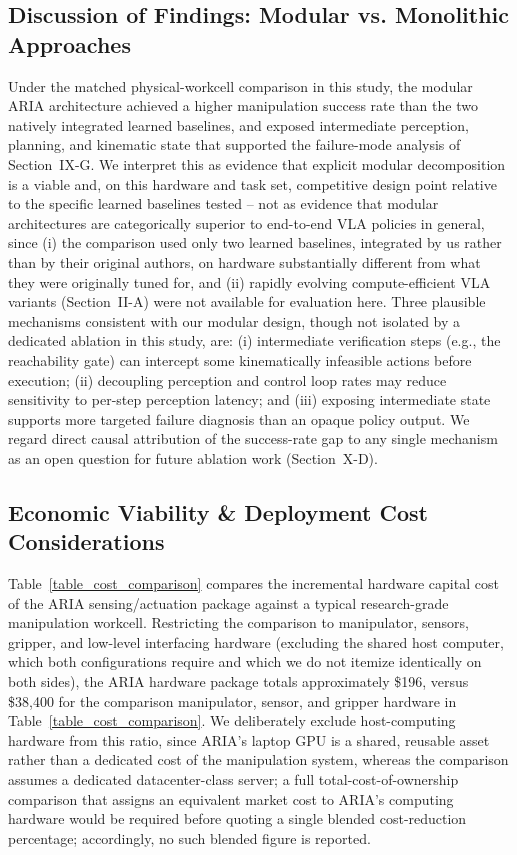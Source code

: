 \documentclass[journal]{IEEEtran}
\begin{document}
\subsection{Discussion of Findings: Modular vs. Monolithic Approaches}
Under the matched physical-workcell comparison in this study, the modular ARIA architecture achieved a higher manipulation success rate than the two natively integrated learned baselines, and exposed intermediate perception, planning, and kinematic state that supported the failure-mode analysis of Section~IX-G. We interpret this as evidence that explicit modular decomposition is a viable and, on this hardware and task set, competitive design point relative to the specific learned baselines tested -- not as evidence that modular architectures are categorically superior to end-to-end VLA policies in general, since (i) the comparison used only two learned baselines, integrated by us rather than by their original authors, on hardware substantially different from what they were originally tuned for, and (ii) rapidly evolving compute-efficient VLA variants (Section~II-A) were not available for evaluation here. Three plausible mechanisms consistent with our modular design, though not isolated by a dedicated ablation in this study, are: (i) intermediate verification steps (e.g., the reachability gate) can intercept some kinematically infeasible actions before execution; (ii) decoupling perception and control loop rates may reduce sensitivity to per-step perception latency; and (iii) exposing intermediate state supports more targeted failure diagnosis than an opaque policy output. We regard direct causal attribution of the success-rate gap to any single mechanism as an open question for future ablation work (Section~X-D).

\subsection{Economic Viability \& Deployment Cost Considerations}
Table~\ref{table_cost_comparison} compares the incremental hardware capital cost of the ARIA sensing/actuation package against a typical research-grade manipulation workcell. Restricting the comparison to manipulator, sensors, gripper, and low-level interfacing hardware (excluding the shared host computer, which both configurations require and which we do not itemize identically on both sides), the ARIA hardware package totals approximately \$196, versus \$38{,}400 for the comparison manipulator, sensor, and gripper hardware in Table~\ref{table_cost_comparison}. We deliberately exclude host-computing hardware from this ratio, since ARIA's laptop GPU is a shared, reusable asset rather than a dedicated cost of the manipulation system, whereas the comparison assumes a dedicated datacenter-class server; a full total-cost-of-ownership comparison that assigns an equivalent market cost to ARIA's computing hardware would be required before quoting a single blended cost-reduction percentage; accordingly, no such blended figure is reported.
\end{document}
